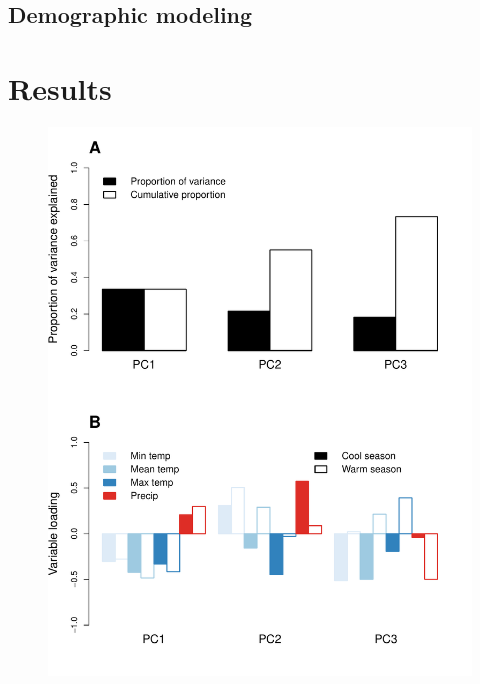 \documentclass[12pt]{article}\usepackage[]{graphicx}\usepackage[]{color}
\begin{document}

\subsection*{Demographic modeling}

\section*{Results}

\newpage
\begin{figure}[h!]
  \caption{}
  \label{Fig1}
  \begin{center}
    \includegraphics[width=0.75\linewidth]{Figures/PCA.pdf}
  \end{center}
\end{figure}
\end{document}
